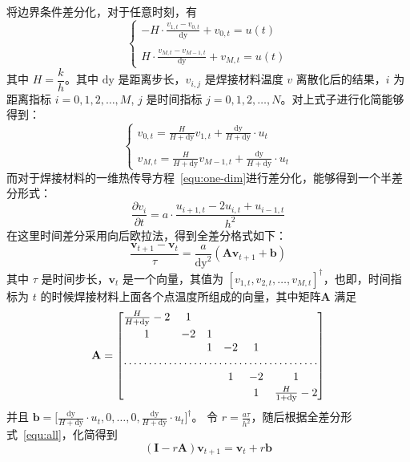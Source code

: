 \documentclass[../main.tex]{subfiles}
\begin{document}
将边界条件差分化，对于任意时刻，有
\begin{equation}
\begin{cases}
\displaystyle - H \cdot \frac{v _{1, t}  - v _{0, t}}{\mathrm{dy}} + v_{0 ,t} = u (t) \\
\\
\displaystyle H \cdot\frac{v_{M , t} - v _{M-1, t}}{\mathrm{dy}} + v_{M,t} = u (t)
\end{cases}
\end{equation}
其中 \(H = \dfrac{k}{h}\)。其中 \(\mathrm{dy}\) 是距离步长，\(v_{i,j}\) 是焊接材料温度 \(v\) 离散化后的结果，\(i\) 为距离指标 \(i = 0,  1,  2 , \dots , M\), \(j\) 是时间指标 \(j = 0 , 1 , 2 , \dots, N\)。对上式子进行化简能够得到：
\begin{equation}
\begin{cases}
\displaystyle v_{0,t} = \frac{H}{H + \mathrm{dy}} v_{1 ,t} + \frac{\mathrm{dy}}{H + \mathrm{dy}} \cdot u_{t}\\
\\
\displaystyle v_{M,t} = \frac{H}{H + \mathrm{dy}} v _{M-1, t} + \frac{\mathrm{dy}}{H + \mathrm{dy}} \cdot u_{t}
\end{cases}
\end{equation}
而对于焊接材料的一维热传导方程~\ref{equ:one-dim}进行差分化，能够得到一个半差分形式：
\begin{equation}
\frac{\partial v _{i}}{\partial t} = a \cdot \frac{u_{i+1, t} - 2 u_{i, t} + u_{i- 1 , t}}{h ^{2}}
\end{equation}
在这里时间差分采用向后欧拉法，得到全差分格式如下：
\begin{equation}\label{equ:all}
\frac{\mathbf{v}_{t+1}  - \mathbf{v}_{t}}{\tau}= \frac{a}{\mathrm{dy}^{2}} (\mathbf{A}\mathbf{v} _{t+1} + \mathbf{b})
\end{equation}
其中 \(\tau\) 是时间步长，\(\mathbf{v}_{t}\) 是一个向量，其值为 \([v _{1, t}, v_{2, t}, \dots, v_{M, t}]^{\dagger}\)，也即，时间指标为 \(t\) 的时候焊接材料上面各个点温度所组成的向量，其中矩阵\(\mathbf A\) 满足
\begin{equation}
\mathbf{A} = 
\begin{bmatrix}
\frac{H}{H + \mathrm{dy}} - 2 & 1 &&\\
\\[-10pt]
1 & -2 & 1 &\\
& & 1 & -2 & 1 \\
\hdotsfor{6}\\
\\[-10pt]
&& & 1 & -2 & 1 \\
\\[-10pt]
&& &  & 1 &\frac{H}{1 + \mathrm{dy}} -2 
\end{bmatrix}
\end{equation}
并且 \(\mathbf{b} = \displaystyle \bigg[ \frac{\mathrm{dy}}{H + \mathrm{dy}} \cdot u_{t} , 0 ,\dots, 0 , \frac{\mathrm{dy}}{H + \mathrm{dy}} \cdot u_{t} \bigg] ^{\dagger}\)。
令 \(r = \displaystyle \frac{a \tau}{h ^{2}}\)，随后根据全差分形式~\ref{equ:all}，化简得到
\begin{equation}
(\mathbf{I} - r\mathbf{A} ) \mathbf{v} _{t+1} = \mathbf{v}_{t} + r \mathbf{b}
\end{equation}
\end{document}
